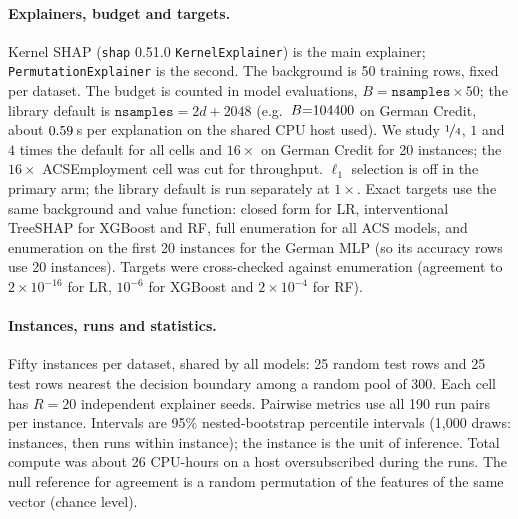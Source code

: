 \paragraph{Explainers, budget and targets.} Kernel SHAP (\texttt{shap} 0.51.0 \texttt{KernelExplainer}) is the main explainer; \texttt{PermutationExplainer} is the second. The background is 50 training rows, fixed per dataset. The budget is counted in model evaluations, $B=\texttt{nsamples}\times50$; the library default is $\texttt{nsamples}=2d+2048$ (e.g.\ $B{=}104400$ on German Credit, about $0.59$\,s per explanation on the shared CPU host used). We study $\nicefrac14$, $1$ and $4$ times the default for all cells and $16\times$ on German Credit for 20 instances; the $16\times$ ACSEmployment cell was cut for throughput. $\ell_1$ selection is off in the primary arm; the library default is run separately at $1\times$. Exact targets use the same background and value function: closed form for LR, interventional TreeSHAP for XGBoost and RF, full enumeration for all ACS models, and enumeration on the first 20 instances for the German MLP (so its accuracy rows use 20 instances). Targets were cross-checked against enumeration (agreement to $2\times10^{-16}$ for LR, $10^{-6}$ for XGBoost and $2\times10^{-4}$ for RF).

\paragraph{Instances, runs and statistics.} Fifty instances per dataset, shared by all models: 25 random test rows and 25 test rows nearest the decision boundary among a random pool of 300. Each cell has $R{=}20$ independent explainer seeds. Pairwise metrics use all 190 run pairs per instance. Intervals are 95\% nested-bootstrap percentile intervals (1{,}000 draws: instances, then runs within instance); the instance is the unit of inference. Total compute was about 26 CPU-hours on a host oversubscribed during the runs. The null reference for agreement is a random permutation of the features of the same vector (chance level).

